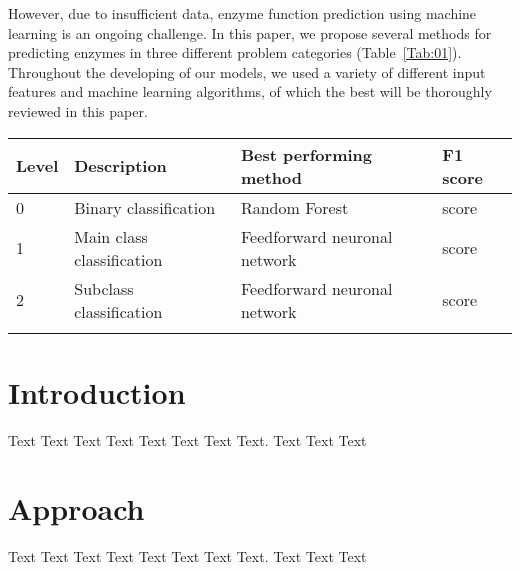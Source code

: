\documentclass{bioinfo}
\begin{document}
However, due to insufficient data, enzyme function prediction using machine learning is an ongoing challenge.
In this paper, we propose several methods for predicting enzymes in three different problem categories (Table~\ref{Tab:01}).
Throughout the developing of our models, we used a variety of different input features and machine learning algorithms, of which the best will be thoroughly reviewed in this paper.
\begin{center}
\begin{table}[!htbp]
 {\begin{tabular}{@{}llll@{}}\toprule 
		Level & Description & Best performing method & F1 score\\\midrule
		0 & Binary classification & Random Forest & score\\
		1 & Main class classification & Feedforward neuronal network & score \\
		2 & Subclass classification & Feedforward neuronal network & score \\\botrule
\end{tabular}}{}
\end{table}
\end{center}




\section{Introduction}

Text Text Text Text Text Text  Text Text.  Text Text Text

\section{Approach}
Text Text Text Text Text Text  Text Text.  Text Text Text
\end{document}
